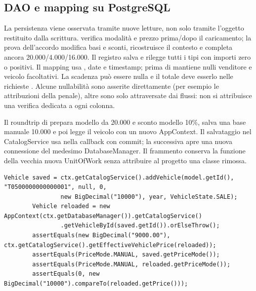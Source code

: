 \subsection{DAO e mapping su PostgreSQL}\label{sec:test-mapping}
La persistenza viene osservata tramite nuove letture, non solo tramite
l'oggetto restituito dalla scrittura. 
verifica modalità e prezzo prima/dopo il caricamento; la prova dell'accordo
modifica basi e sconti, ricostruisce il contesto e completa ancora
20.000/4.000/16.000. Il registro salva e rilegge tutti i tipi con importi
zero o positivi. Il mapping usa , date e timestamp;
 prima di  mantiene nulli venditore e veicolo
facoltativi. La scadenza può essere nulla e il totale deve esserlo nelle
richieste . Alcune nullabilità sono asserite direttamente
(per esempio le attribuzioni della penale), altre sono solo attraversate
dai flussi: non si attribuisce una verifica dedicata a ogni colonna.

Il roundtrip di 
prepara modello da 20.000 e sconto modello 10\%, salva una base manuale
10.000 e poi legge il veicolo con un nuovo AppContext. Il salvataggio nel
CatalogService usa  nella callback con commit;
la successiva  apre una nuova connessione del medesimo
DatabaseManager. Il frammento conserva la funzione della vecchia nuova
UnitOfWork senza attribuire al progetto una classe rimossa.

\noindent\begin{minipage}{\linewidth}
\begin{lstlisting}[firstnumber=62,caption={Base, modalità e prezzo osservati dopo una nuova lettura DAO.},label=lst:test-dao-roundtrip]
        Vehicle saved = ctx.getCatalogService().addVehicle(model.getId(), "T0500000000000001", null, 0,
                new BigDecimal("10000"), year, VehicleState.SALE);
        Vehicle reloaded = new AppContext(ctx.getDatabaseManager()).getCatalogService()
                .getVehicleById(saved.getId()).orElseThrow();
        assertEquals(new BigDecimal("9000.00"), ctx.getCatalogService().getEffectiveVehiclePrice(reloaded));
        assertEquals(PriceMode.MANUAL, saved.getPriceMode());
        assertEquals(PriceMode.MANUAL, reloaded.getPriceMode());
        assertEquals(0, new BigDecimal("10000").compareTo(reloaded.getPrice()));
\end{lstlisting}
\end{minipage}


